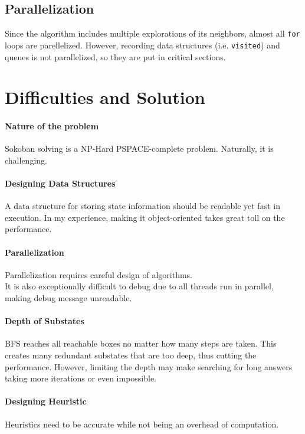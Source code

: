 \documentclass[a4paper, 10pt]{article}
\begin{document}
        \subsection{Parallelization}
            Since the algorithm includes multiple explorations of its neighbors, 
            almost all \texttt{for} loops are parellelized. 
            However, recording data structures (i.e. \texttt{visited}) and queues is not parallelized, 
            so they are put in critical sections.

    \section{Difficulties and Solution}
        \paragraph{Nature of the problem}
            Sokoban solving is a NP-Hard PSPACE-complete problem. Naturally, it is challenging.
        \paragraph{Designing Data Structures}
            A data structure for storing state information should be readable yet fast in execution.
            In my experience, making it object-oriented takes great toll on the performance.
        \paragraph{Parallelization}
            Parallelization requires careful design of algorithms. \\
            It is also exceptionally difficult to debug due to all threads run in parallel, 
            making debug message unreadable.
        \paragraph{Depth of Substates}
            BFS reaches all reachable boxes no matter how many steps are taken.
            This creates many redundant substates that are too deep, thus cutting the performance.
            However, limiting the depth may make searching for long answers 
            taking more iterations or even impossible.
        \paragraph{Designing Heuristic}
            Heuristics need to be accurate while not being an overhead of computation.
\end{document}
